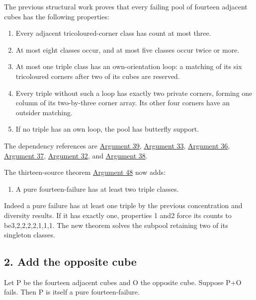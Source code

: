 \documentclass[
  10pt,
]{article}
\providecommand{\tightlist}{%
  \setlength{\itemsep}{0pt}\setlength{\parskip}{0pt}}
\begin{document}
The previous structural work proves that every failing pool of fourteen
adjacent cubes has the following properties:

\begin{enumerate}
\def\labelenumi{\arabic{enumi}.}
\tightlist
\item
  Every adjacent tricoloured-corner class has count at most three.
\item
  At most eight classes occur, and at most five classes occur twice or
  more.
\item
  At most one triple class has an own-orientation loop: a matching of
  its six tricoloured corners after two of its cubes are reserved.
\item
  Every triple without such a loop has exactly two private corners,
  forming one column of its two-by-three corner array. Its other four
  corners have an outsider matching.
\item
  If no triple has an own loop, the pool has butterfly support.
\end{enumerate}

The dependency references are \protect\hyperlink{arg-39}{Argument 39},
\protect\hyperlink{arg-33}{Argument 33},
\protect\hyperlink{arg-36}{Argument 36},
\protect\hyperlink{arg-37}{Argument 37},
\protect\hyperlink{arg-32}{Argument 32}, and
\protect\hyperlink{arg-38}{Argument 38}.

The thirteen-source theorem \protect\hyperlink{arg-48}{Argument 48} now
adds:

\begin{enumerate}
\def\labelenumi{\arabic{enumi}.}
\setcounter{enumi}{5}
\tightlist
\item
  A pure fourteen-failure has at least two triple classes.
\end{enumerate}

Indeed a pure failure has at least one triple by the previous
concentration and diversity results. If it has exactly one, properties 1
and2 force its counts to be3,2,2,2,2,1,1,1. The new theorem solves the
subpool retaining two of its singleton classes.

\hypertarget{add-the-opposite-cube}{%
\subsection*{2. Add the opposite cube}\label{add-the-opposite-cube}}

Let P be the fourteen adjacent cubes and O the opposite cube. Suppose
P+O fails. Then P is itself a pure fourteen-failure.
\end{document}
